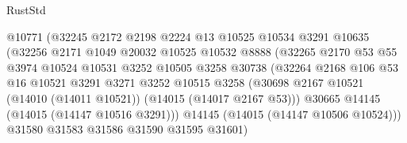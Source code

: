 \begin{lexlean}{RustStd}
\begin{coremodule}
                                  @10771
                                  (@32245
                                    @2172
                                    @2198
                                    @2224
                                    @13
                                    @10525
                                    @10534
                                    @3291
                                    @10635
                                    (@32256
                                      @2171
                                      @1049
                                      @20032
                                      @10525
                                      @10532
                                      @8888
                                      (@32265
                                        @2170
                                        @53
                                        @55
                                        @3974
                                        @10524
                                        @10531
                                        @3252
                                        @10505
                                        @3258
                                        @30738
                                        (@32264
                                          @2168
                                          @106
                                          @53
                                          @16
                                          @10521
                                          @3291
                                          @3271
                                          @3252
                                          @10515
                                          @3258
                                          (@30698
                                            @2167
                                            @10521
                                            (@14010 (@14011 @10521))
                                            (@14015 (@14017 @2167 @53)))
                                          @30665
                                          @14145
                                          (@14015 (@14147 @10516 @3291)))
                                        @14145
                                        (@14015 (@14147 @10506 @10524)))
                                      @31580
                                      @31583
                                      @31586
                                      @31590
                                      @31595
                                      @31601)

\end{coremodule}
\end{lexlean}
